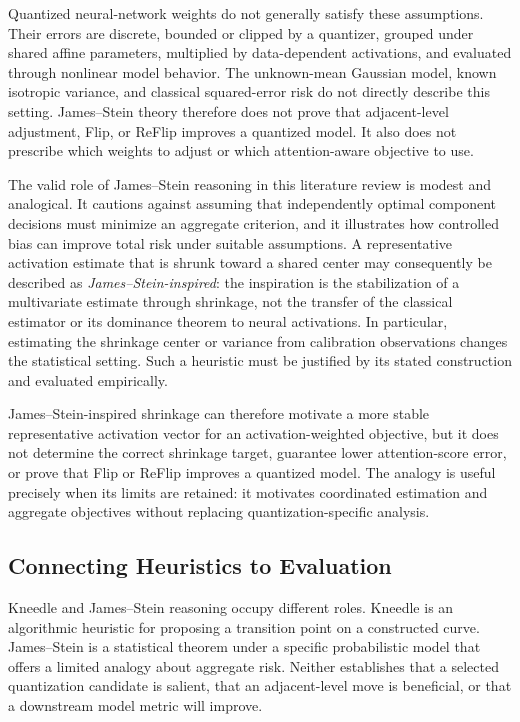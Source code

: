 Quantized neural-network weights do not generally satisfy these assumptions. Their errors are discrete, bounded or clipped by a quantizer, grouped under shared affine parameters, multiplied by data-dependent activations, and evaluated through nonlinear model behavior. The unknown-mean Gaussian model, known isotropic variance, and classical squared-error risk do not directly describe this setting. James--Stein theory therefore does not prove that adjacent-level adjustment, Flip, or ReFlip improves a quantized model. It also does not prescribe which weights to adjust or which attention-aware objective to use.

The valid role of James--Stein reasoning in this literature review is modest and analogical. It cautions against assuming that independently optimal component decisions must minimize an aggregate criterion, and it illustrates how controlled bias can improve total risk under suitable assumptions. A representative activation estimate that is shrunk toward a shared center may consequently be described as \emph{James--Stein-inspired}: the inspiration is the stabilization of a multivariate estimate through shrinkage, not the transfer of the classical estimator or its dominance theorem to neural activations. In particular, estimating the shrinkage center or variance from calibration observations changes the statistical setting. Such a heuristic must be justified by its stated construction and evaluated empirically.

James--Stein-inspired shrinkage can therefore motivate a more stable representative activation vector for an activation-weighted objective, but it does not determine the correct shrinkage target, guarantee lower attention-score error, or prove that Flip or ReFlip improves a quantized model. The analogy is useful precisely when its limits are retained: it motivates coordinated estimation and aggregate objectives without replacing quantization-specific analysis.

\subsection{Connecting Heuristics to Evaluation}

Kneedle and James--Stein reasoning occupy different roles. Kneedle is an algorithmic heuristic for proposing a transition point on a constructed curve. James--Stein is a statistical theorem under a specific probabilistic model that offers a limited analogy about aggregate risk. Neither establishes that a selected quantization candidate is salient, that an adjacent-level move is beneficial, or that a downstream model metric will improve.

